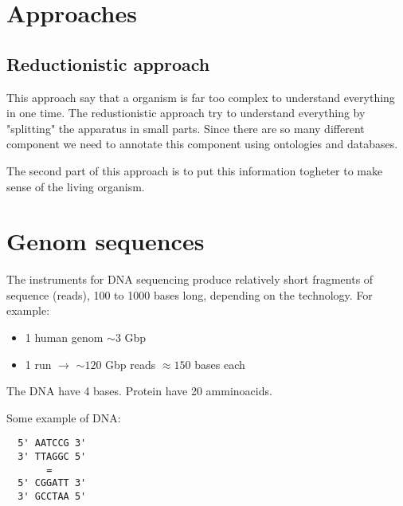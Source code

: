 \section{Approaches}
\subsection{Reductionistic approach}
This approach say that a organism is far too complex to understand everything
in one time. The redustionistic approach try to understand everything by
"splitting" the apparatus in small parts. Since there are so many different
component we need to annotate this component using ontologies and databases.

The second part of this approach is to put this information togheter to make
sense of the living organism.

\section{Genom sequences}
The instruments for DNA sequencing produce relatively short fragments of
sequence (reads), 100 to 1000 bases long, depending on the technology.
For example:
\begin{itemize}
  \item 1 human genom $\sim3$ Gbp
  \item 1 run $\to$ $\sim120$ Gbp reads $\approx150$ bases each
\end{itemize}

The DNA have 4 bases.
Protein have 20 amminoacids.

Some example of DNA:
\begin{verbatim}
  5' AATCCG 3'
  3' TTAGGC 5'
       =
  5' CGGATT 3'
  3' GCCTAA 5'
\end{verbatim}
